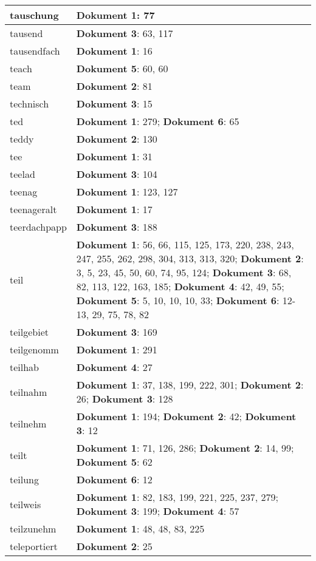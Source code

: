 \documentclass[a5paper]{article}
\begin{document}
\begin{longtable}[l]{|l|p{3in}|}
\hline
tauschung & \textbf{Dokument 1}: 77 \\
\hline
tausend & \textbf{Dokument 3}: 63, 117 \\
\hline
tausendfach & \textbf{Dokument 1}: 16 \\
\hline
teach & \textbf{Dokument 5}: 60, 60 \\
\hline
team & \textbf{Dokument 2}: 81 \\
\hline
technisch & \textbf{Dokument 3}: 15 \\
\hline
ted & \textbf{Dokument 1}: 279; \textbf{Dokument 6}: 65 \\
\hline
teddy & \textbf{Dokument 2}: 130 \\
\hline
tee & \textbf{Dokument 1}: 31 \\
\hline
teelad & \textbf{Dokument 3}: 104 \\
\hline
teenag & \textbf{Dokument 1}: 123, 127 \\
\hline
teenageralt & \textbf{Dokument 1}: 17 \\
\hline
teerdachpapp & \textbf{Dokument 3}: 188 \\
\hline
teil & \textbf{Dokument 1}: 56, 66, 115, 125, 173, 220, 238, 243, 247, 255, 262, 298, 304, 313, 313, 320; \textbf{Dokument 2}: 3, 5, 23, 45, 50, 60, 74, 95, 124; \textbf{Dokument 3}: 68, 82, 113, 122, 163, 185; \textbf{Dokument 4}: 42, 49, 55; \textbf{Dokument 5}: 5, 10, 10, 10, 33; \textbf{Dokument 6}: 12-13, 29, 75, 78, 82 \\
\hline
teilgebiet & \textbf{Dokument 3}: 169 \\
\hline
teilgenomm & \textbf{Dokument 1}: 291 \\
\hline
teilhab & \textbf{Dokument 4}: 27 \\
\hline
teilnahm & \textbf{Dokument 1}: 37, 138, 199, 222, 301; \textbf{Dokument 2}: 26; \textbf{Dokument 3}: 128 \\
\hline
teilnehm & \textbf{Dokument 1}: 194; \textbf{Dokument 2}: 42; \textbf{Dokument 3}: 12 \\
\hline
teilt & \textbf{Dokument 1}: 71, 126, 286; \textbf{Dokument 2}: 14, 99; \textbf{Dokument 5}: 62 \\
\hline
teilung & \textbf{Dokument 6}: 12 \\
\hline
teilweis & \textbf{Dokument 1}: 82, 183, 199, 221, 225, 237, 279; \textbf{Dokument 3}: 199; \textbf{Dokument 4}: 57 \\
\hline
teilzunehm & \textbf{Dokument 1}: 48, 48, 83, 225 \\
\hline
teleportiert & \textbf{Dokument 2}: 25 \\

\end{longtable}
\end{document}

